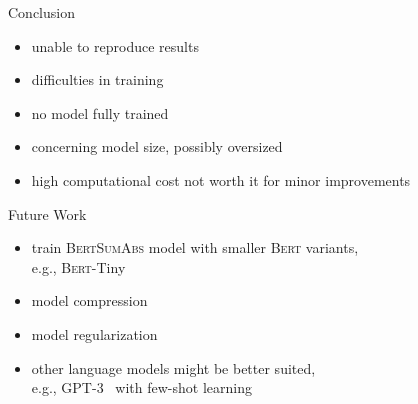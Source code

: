 \documentclass[english,handout]{mlutalk}
\newcommand{\Bert}{\textsc{Bert}\xspace}
\newcommand{\BertTiny}{\textsc{Bert}-Tiny\xspace}
\newcommand{\BertSumAbs}{\textsc{BertSumAbs}\xspace}
\begin{document}
\begin{frame}{Conclusion}
    \begin{itemize}
        \item unable to reproduce results
        \item difficulties in training
        \item no model fully trained 
        \item concerning model size, possibly oversized
        \item high computational cost not worth it for minor improvements
    \end{itemize}
        
\end{frame}

\begin{frame}{Future Work}
    \begin{itemize}
        \item train \BertSumAbs model with smaller \Bert variants, \\ e.g., \BertTiny~\cite{TurcCLT2019}
        \item model compression
        \item model regularization
        \item other language models might be better suited, \\ e.g., GPT-3~\cite{BrownMRSKDNSSAA2020} with few-shot learning
    \end{itemize}
    \thankyou
\end{frame}



\appendix
\section{\appendixname}

\bibliographyframe
\end{document}
